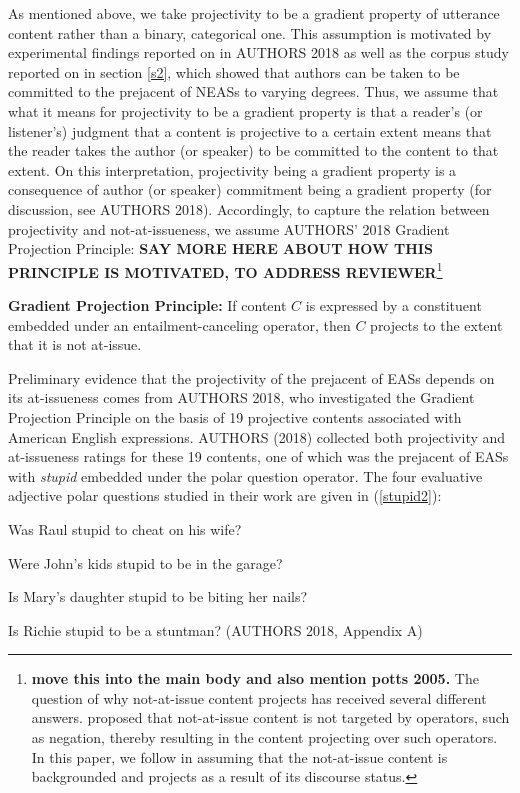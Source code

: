 \documentclass[11pt,fleqn]{article}
\newcommand{\6}{\mbox{$[\hspace*{-.6mm}[$}}
\newcommand{\9}{\mbox{$]\hspace*{-.6mm}]$}}
\begin{document}
As mentioned above, we take projectivity to be a gradient property of utterance content rather than a binary, categorical one. This assumption is motivated by experimental findings reported on in AUTHORS 2018 as well as the corpus study reported on in section \ref{s2}, which showed that authors can be taken to be committed to the prejacent of NEASs to varying degrees. Thus, we assume that what it means for projectivity to be a gradient property is that a reader's (or listener's) judgment that a content is projective to a certain extent means that the reader takes the author (or speaker) to be committed to the content to that extent. On this interpretation, projectivity being a gradient property is a consequence of author (or speaker) commitment being a gradient property (for discussion, see AUTHORS 2018). Accordingly, to capture the relation between projectivity and not-at-issueness, we assume AUTHORS' 2018 Gradient Projection Principle: {\bf SAY MORE HERE ABOUT HOW THIS PRINCIPLE IS MOTIVATED, TO ADDRESS REVIEWER}\footnote{{\bf move this into the main body and also mention potts 2005.} The question of why not-at-issue content projects has received several different answers. \citet{brst-salt10} proposed that not-at-issue content is not targeted by operators, such as negation, thereby resulting in the content projecting over such operators. In this paper, we follow \citet{abrusan2011} in assuming that the not-at-issue content is backgrounded and projects as a result of its discourse status.}

\begin{exe}
\ex\label{gpp} {\bf Gradient Projection Principle:} If content $C$ is expressed by a constituent embedded under an entailment-canceling operator, then $C$ projects to the 
extent that it is not at-issue.

\end{exe}

Preliminary evidence that the projectivity of the prejacent of EASs depends on its at-issueness comes from AUTHORS 2018, who investigated the Gradient Projection Principle on the basis of 19 projective contents associated with American English expressions. AUTHORS (2018) collected both projectivity and at-issueness ratings for these 19 contents, one of which was the prejacent of EASs with {\em stupid} embedded under the polar question operator. The four evaluative adjective polar questions studied in their work are given in (\ref{stupid2}):

\begin{exe}
\ex\label{stupid2}

\begin{xlist}

\ex Was Raul stupid to cheat on his wife?

\ex Were John's kids stupid to be in the garage?

\ex Is Mary's daughter stupid to be biting her nails?

\ex Is Richie stupid to be a stuntman? \hfill (AUTHORS 2018, Appendix A)

\end{xlist}

\end{exe}
\end{document}
